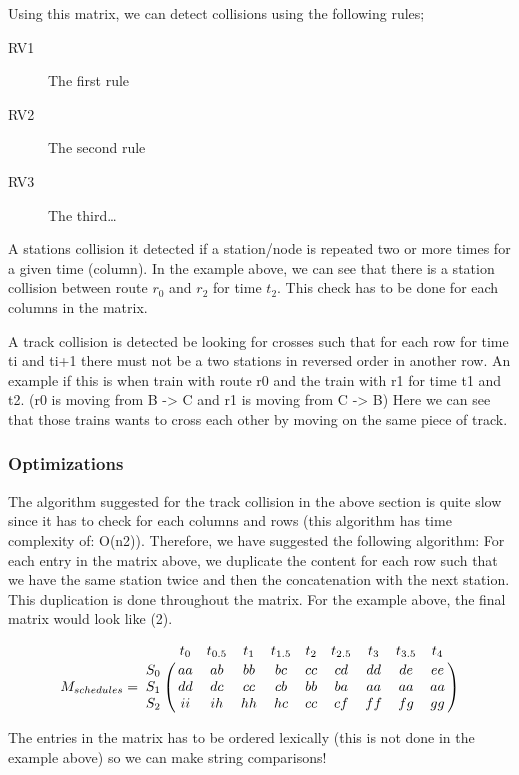 \documentclass[10pt,a4paper]{article}
\begin{document}
Using this matrix, we can detect collisions using the following rules;

\begin{description}
  \item[RV1] The first rule
  \item[RV2] The second rule 
  \item[RV3] The third\ldots
\end{description}
 
A stations collision it detected if a station/node is repeated two or more times for a given time (column).
In the example above, we can see that there is a station collision between route $r_0$ and $r_2$ for time $t_2$.
This check has to be done for each columns in the matrix.
 
A track collision is detected be looking for crosses such that for each row for time ti and ti+1 there must not be a two stations in reversed order in another row.
An example if this is when train with route r0 and the train with r1 for time t1 and t2. (r0 is moving from B -> C and r1 is moving from C -> B) Here we can see that those trains wants to cross each other by moving on the same piece of track.  

\subsubsection{Optimizations}
 
The algorithm suggested for the track collision in the above section is quite slow since it has to check for each columns and rows (this algorithm has time complexity of: O(n2)).
Therefore, we have suggested the following algorithm:
For each entry in the matrix above, we duplicate the content for each row such that we have the same station twice and then the concatenation with the next station. This duplication is done throughout the matrix. For the example above, the final matrix would look like (2).

\begin{equation}
M_{schedules} = \bordermatrix{
                    ~ & t_0 & t_{0.5} & t_1 & t_{1.5} & t_2 & t_{2.5} & t_3 & t_{3.5} & t_4 \cr
                  S_0 & aa  &  ab     & bb  &  bc     & cc  &  cd     & dd  & de      & ee\cr
                  S_1 & dd  &  dc     & cc  &  cb     & bb  &  ba     & aa  & aa      & aa\cr
                  S_2 & ii  &  ih     & hh  &  hc     & cc  &  cf     & ff  & fg      & gg}
\end{equation}

The entries in the matrix has to be ordered lexically (this is not done in the example above) so we can make string comparisons!
 
\end{document}
